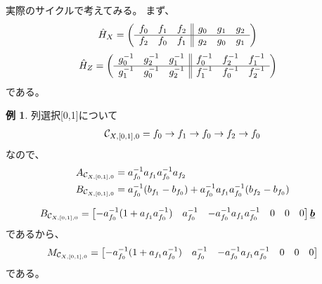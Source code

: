 \documentclass[a4paper,11pt,dvipdfmx]{jsarticle}
\theoremstyle{definition}
\newtheorem{example}[definition]{例}
\begin{document}
実際のサイクルで考えてみる。
まず、
\begin{align}
  \hat{H}_X
  &= \left(
    \begin{array}{ccc||ccc}
    f_0 & f_1 & f_2 & g_0 & g_1 & g_2 \\\hline
    f_2 & f_0 & f_1 & g_2 & g_0 & g_1
\end{array}
\right)
\end{align}
\begin{align}
\hat{H}_Z 
&= \left(
  \begin{array}{ccc||ccc}
  g_0^{-1} & g_{2}^{-1} & g_{1}^{-1} & f_0^{-1} & f_{2}^{-1} & f_{1}^{-1} \\\hline
  g_1^{-1} & g_0^{-1} & g_{2}^{-1} & f_1^{-1} & f_0^{-1} & f_{2}^{-1}
\end{array}
\right)
\end{align}
である。
\begin{example}
  
  列選択[0,1]について
  \begin{align}
  \mathcal{C}_{{X},{[0,1]},{0}}=f_0\rightarrow f_1\rightarrow f_0\rightarrow f_2\rightarrow f_0
\end{align}
  なので、
  \begin{align}
    A_{\mathcal{C}_{{X},{[0,1]},{0}}} &= a_{f_0}^{-1} a_{f_1} a_{f_0}^{-1} a_{f_2}\\B_{\mathcal{C}_{{X},{[0,1]},{0}}} &= a_{f_0}^{-1}(b_{f_1} - b_{f_0}) + a_{f_0}^{-1} a_{f_1} a_{f_0}^{-1} (b_{f_2} - b_{f_0})\\
  \end{align}

  \begin{align}
  B_{\mathcal{C}_{{X},{[0,1]},{0}}} &= 
  \begin{bmatrix}
    -a_{f_0}^{-1}(1+a_{f_1}a_{f_0}^{-1}) & a_{f_0}^{-1} & - a_{f_0}^{-1} a_{f_1}a_{f_0}^{-1} & 0 & 0 & 0
  \end{bmatrix}
  \underline{\bm{b}}
\end{align}
であるから、
\begin{align}
    M_{\mathcal{C}_{{X},{[0,1]},{0}}} =
    \begin{bmatrix}
      -a_{f_0}^{-1}(1+a_{f_1}a_{f_0}^{-1}) & a_{f_0}^{-1} & - a_{f_0}^{-1} a_{f_1}a_{f_0}^{-1} & 0 & 0 & 0
  \end{bmatrix}
\end{align}
である。
\end{example}
        

\end{document}
